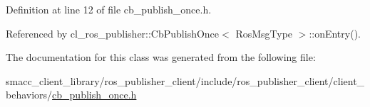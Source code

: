 Definition at line 12 of file cb\+\_\+publish\+\_\+once.\+h.



Referenced by cl\+\_\+ros\+\_\+publisher\+::\+Cb\+Publish\+Once$<$ Ros\+Msg\+Type $>$\+::on\+Entry().



The documentation for this class was generated from the following file\+:\begin{DoxyCompactItemize}
\item 
smacc\+\_\+client\+\_\+library/ros\+\_\+publisher\+\_\+client/include/ros\+\_\+publisher\+\_\+client/client\+\_\+behaviors/\hyperlink{cb__publish__once_8h}{cb\+\_\+publish\+\_\+once.\+h}\end{DoxyCompactItemize}
